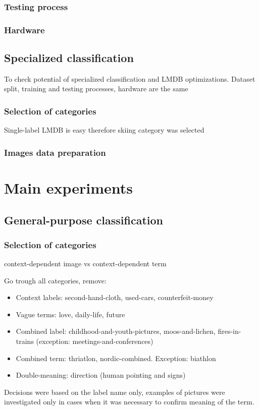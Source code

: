     \subsubsection{Testing process}
    \subsubsection{Hardware}

\subsection{Specialized classification}
To check potential of specialized classification and LMDB optimizations. Dataset split, training and testing processes, hardware are the same
    \subsubsection{Selection of categories}
    Single-label LMDB is easy therefore skiing category was selected
    \subsubsection{Images data preparation}


\section{Main experiments}
    \subsection{General-purpose classification}
    \subsubsection{Selection of categories}
    
    context-dependent image vs context-dependent term
    
    
    Go trough all categories, remove:
    \begin{itemize}
        \item Context labels: second-hand-cloth, used-cars, counterfeit-money
        \item Vague terms: love, daily-life, future
        \item Combined label: childhood-and-youth-pictures, moos-and-lichen, fires-in-trains (exception: meetings-and-conferences)
        \item Combined term: thriatlon, nordic-combined. Exception: biathlon
        \item Double-meaning: direction (human pointing and signs)
    \end{itemize}
    Decisions were based on the label name only, examples of pictures were investigated only in cases when it was necessary to confirm meaning of the term.
    
